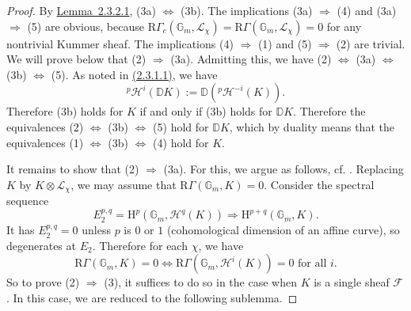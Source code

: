 \begin{proof}
By \hyperref[lem:2.3.2.1]{Lemma~2.3.2.1}, (3a) \(\Leftrightarrow\) (3b). The
implications (3a) \(\Rightarrow\) (4) and (3a) \(\Rightarrow\) (5) are
obvious, because
\(\mathrm{R}\Gamma_c(\mathbb{G}_m,\mathcal{L}_\chi)
=\mathrm{R}\Gamma(\mathbb{G}_m,\mathcal{L}_\chi)=0\) for any nontrivial
Kummer sheaf. The implications (4) \(\Rightarrow\) (1) and (5)
\(\Rightarrow\) (2) are trivial. We will prove below that (2) \(\Rightarrow\)
(3a). Admitting this, we have (2) \(\Leftrightarrow\) (3a) \(\Leftrightarrow\)
(3b) \(\Leftrightarrow\) (5). As noted in
\hyperref[par:2.3.1.1]{(2.3.1.1)}, we have
\[
  {}^p\mathcal{H}^i(\mathbb{D}K):=
  \mathbb{D}({}^p\mathcal{H}^{-i}(K)).
\]
Therefore (3b) holds for \(K\) if and only if (3b) holds for \(\mathbb{D}K\).
Therefore the equivalences (2) \(\Leftrightarrow\) (3b) \(\Leftrightarrow\)
(5) hold for \(\mathbb{D}K\), which by duality means that the equivalences
(1) \(\Leftrightarrow\) (3b) \(\Leftrightarrow\) (4) hold for \(K\).

It remains to show that (2) \(\Rightarrow\) (3a). For this, we argue as
follows, cf. \cite[2.5.3]{Ka-ACT}. Replacing \(K\) by
\(K\otimes\mathcal{L}_\chi\), we may assume that
\(\mathrm{R}\Gamma(\mathbb{G}_m,K)=0\). Consider the spectral sequence
\[
  E_2^{p,q}=\mathrm{H}^p(\mathbb{G}_m,\mathcal{H}^q(K))
  \Rightarrow \mathrm{H}^{p+q}(\mathbb{G}_m,K).
\]
It has \(E_2^{p,q}=0\) unless \(p\) is \(0\) or \(1\) (cohomological dimension
of an affine curve), so degenerates at \(E_2\). Therefore for each \(\chi\),
we have
\[
  \mathrm{R}\Gamma(\mathbb{G}_m,K)=0
  \Leftrightarrow
  \mathrm{R}\Gamma(\mathbb{G}_m,\mathcal{H}^i(K))=0
  \text{ for all }i.
\]
So to prove (2) \(\Rightarrow\) (3), it suffices to do so in the case when
\(K\) is a single sheaf \(\mathcal{F}\). In this case, we are reduced to the
following sublemma.
\end{proof}


